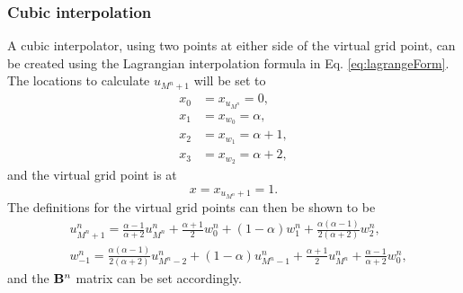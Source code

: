 \subsubsection{Cubic interpolation}
A cubic interpolator, using two points at either side of the virtual grid point, can be created using the Lagrangian interpolation formula in Eq. \eqref{eq:lagrangeForm}. The locations to calculate $u_{M^n+1}$ will be set to
\begin{equation}
    \begin{aligned}
     x_0 &= x_{u_{M^n}} = 0, \\
     x_1 &= x_{w_0} = \alpha, \\
     x_2& = x_{w_1} = \alpha + 1, \\
     x_3 &= x_{w_2} = \alpha + 2,
    \end{aligned}
\end{equation}
and the virtual grid point is at
\begin{equation}
    x = x_{u_{M^n}+1} = 1.
\end{equation}
The definitions for the virtual grid points can then be shown to be
\begin{subequations}\label{eq:cubicVirtualGridpoints}
    \begin{align}
            &u_{M^n+1}^n = \frac{\alpha - 1}{\alpha + 2}u_{M^n}^n + \frac{\alpha + 1}{2}w_0^n + (1-\alpha)w_1^n + \frac{\alpha (\alpha - 1)}{2(\alpha+2)}w_2^n,\\
            &w_{-1}^n = \frac{\alpha (\alpha - 1)}{2(\alpha+2)}u_{M^n-2}^n + (1-\alpha) u_{M^n-1}^n + \frac{\alpha+1}{2} u_{M^n}^n+ \frac{\alpha - 1}{\alpha + 2}w_{0}^n,
    \end{align}
\end{subequations}
and the $\mathbf{B}^n$ matrix can be set accordingly. 

